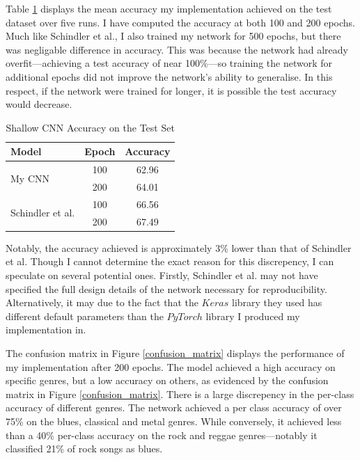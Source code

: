 \documentclass[conference]{IEEEtran}
\begin{document}
Table \ref{shallow_results} displays the mean accuracy my implementation achieved on the test dataset over five runs.
I have computed the accuracy at both 100 and 200 epochs.
Much like Schindler et al., I also trained my network for 500 epochs, but there was negligable difference in accuracy.
This was because the network had already overfit---achieving a test accuracy of near 100\%---so training the network for additional epochs did not improve the network's ability to generalise.
In this respect, if the network were trained for longer, it is possible the test accuracy would decrease.

\begin{table}[htbp]
    \caption{Shallow CNN Accuracy on the Test Set}
    \begin{center}
    \begin{tabular}{l c c}
    \toprule
    \textbf{Model}&\textbf{Epoch}&\textbf{Accuracy}\\
    \midrule
    \multirow{ 2}{*}{My CNN} & 100 & 62.96 \\
    & 200 & 64.01 \\
    \midrule
    \multirow{ 2}{*}{Schindler et al.} & 100 & 66.56\\
    & 200 & 67.49 \\
    \bottomrule
    \end{tabular}
    \label{shallow_results}
    \end{center}
\end{table}

Notably, the accuracy achieved is approximately 3\% lower than that of Schindler et al.
Though I cannot determine the exact reason for this discrepency, I can speculate on several potential ones.
Firstly, Schindler et al. may not have specified the full design details of the network necessary for reproducibility.
Alternatively, it may due to the fact that the $Keras$ library they used has different default parameters than the $PyTorch$ library I produced my implementation in.

The confusion matrix in Figure \ref{confusion_matrix} displays the performance of my implementation after 200 epochs.
The model achieved a high accuracy on specific genres, but a low accuracy on others, as evidenced by the confusion matrix in Figure \ref{confusion_matrix}.
There is a large discrepency in the per-class accuracy of different genres.
The network achieved a per class accuracy of over 75\% on the blues, classical and metal genres.
While conversely, it achieved less than a 40\% per-class accuracy on the rock and reggae genres---notably it classified 21\% of rock songs as blues.
\end{document}
